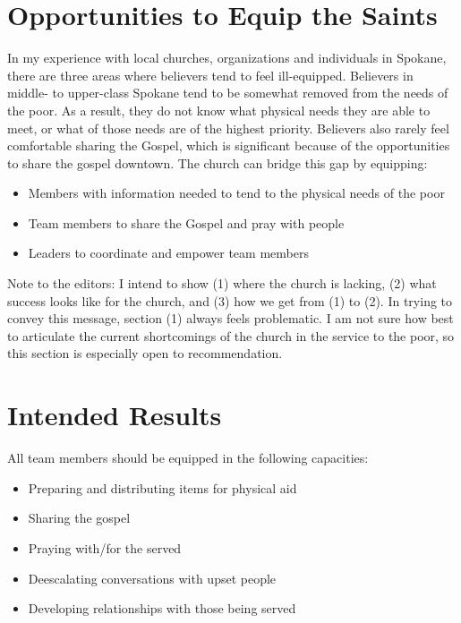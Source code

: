 \documentclass[12pt]{article}
\begin{document}
\section{Opportunities to Equip the Saints}

    In my experience with local churches, organizations and individuals in Spokane, there are three areas where believers tend to feel ill-equipped.
    Believers in middle- to upper-class Spokane tend to be somewhat removed from the needs of the poor.
    As a result, they do not know what physical needs they are able to meet, or what of those needs are of the highest priority.
    Believers also rarely feel comfortable sharing the Gospel, which is significant because of the opportunities to share the gospel downtown.
    The church can bridge this gap by equipping:
    \begin{itemize}
        \item Members with information needed to tend to the physical needs of the poor
        \item Team members to share the Gospel and pray with people
        \item Leaders to coordinate and empower team members
    \end{itemize}
    \par Note to the editors: I intend to show (1) where the church is lacking, (2) what success looks like for the church, and (3) how we get from (1) to (2).
    In trying to convey this message, section (1) always feels problematic.
    I am not sure how best to articulate the current shortcomings of the church in the service to the poor, so this section is especially open to recommendation.


\qJamesOneTwentySeven

\section{Intended Results}

    All team members should be equipped in the following capacities:
    \begin{itemize}
        \item Preparing and distributing items for physical aid
        \item Sharing the gospel
        \item Praying with/for the served
        \item Deescalating conversations with upset people
        \item Developing relationships with those being served
    \end{itemize}
\end{document}
